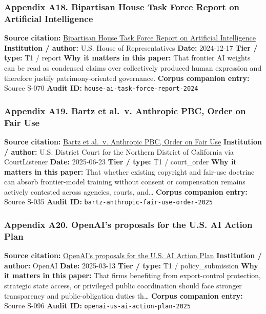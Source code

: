 \documentclass[
  american,
  11pt,
  letterpaper,
]{article}
\begin{document}
\subsubsection{Appendix A18. Bipartisan House Task Force Report on
Artificial
Intelligence}\label{appendix-a18-bipartisan-house-task-force-report-on-artificial-intelligence}

\textbf{Source citation:}
\href{https://www.speaker.gov/wp-content/uploads/2024/12/AI-Task-Force-Report-FINAL.pdf}{Bipartisan
House Task Force Report on Artificial Intelligence} \textbf{Institution
/ author:} U.S. House of Representatives \textbf{Date:} 2024-12-17
\textbf{Tier / type:} T1 / report \textbf{Why it matters in this paper:}
That frontier AI weights can be read as condensed claims over
collectively produced human expression and therefore justify
patrimony-oriented governance. \textbf{Corpus companion entry:} Source
S-070 \textbf{Audit ID:} \texttt{house-ai-task-force-report-2024}

\subsubsection{Appendix A19. Bartz et al.~v. Anthropic PBC, Order on
Fair
Use}\label{appendix-a19-bartz-et-al-v-anthropic-pbc-order-on-fair-use}

\textbf{Source citation:}
\href{https://storage.courtlistener.com/recap/gov.uscourts.cand.434709/gov.uscourts.cand.434709.231.0_3.pdf}{Bartz
et al.~v. Anthropic PBC, Order on Fair Use} \textbf{Institution /
author:} U.S. District Court for the Northern District of California via
CourtListener \textbf{Date:} 2025-06-23 \textbf{Tier / type:} T1 /
court\_order \textbf{Why it matters in this paper:} That whether
existing copyright and fair-use doctrine can absorb frontier-model
training without consent or compensation remains actively contested
across agencies, courts, and\ldots{} \textbf{Corpus companion entry:}
Source S-035 \textbf{Audit ID:}
\texttt{bartz-anthropic-fair-use-order-2025}

\subsubsection{Appendix A20. OpenAI's proposals for the U.S. AI Action
Plan}\label{appendix-a20-openais-proposals-for-the-us-ai-action-plan}

\textbf{Source citation:}
\href{https://openai.com/global-affairs/openai-proposals-for-the-us-ai-action-plan/}{OpenAI's
proposals for the U.S. AI Action Plan} \textbf{Institution / author:}
OpenAI \textbf{Date:} 2025-03-13 \textbf{Tier / type:} T1 /
policy\_submission \textbf{Why it matters in this paper:} That firms
benefiting from export-control protection, strategic state access, or
privileged public coordination should face stronger transparency and
public-obligation duties th\ldots{} \textbf{Corpus companion entry:}
Source S-096 \textbf{Audit ID:} \texttt{openai-us-ai-action-plan-2025}
\end{document}
